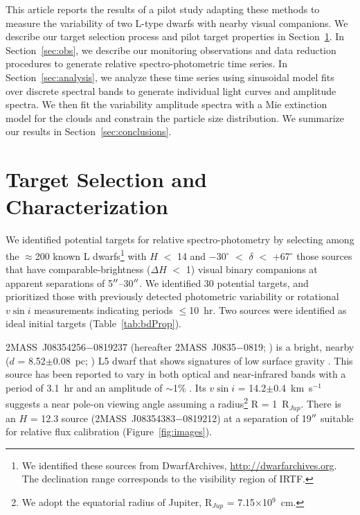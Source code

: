 \documentclass[twocolumn]{aastex6}
\newcommand{\degree}{$^\circ$}
\newcommand{\kms}{km~s$^{-1}$}
\newcommand{\rjup}{R$_{Jup}$}
\newcommand{\sha}{2MASS~J0835$-$0819}
\begin{document}
This article reports the results of a pilot study adapting these methods to measure the variability of two L-type dwarfs with nearby visual companions. We describe our target selection process and pilot target properties in Section~\ref{sec:targets}.
In Section~\ref{sec:obs}, we describe our monitoring observations and data reduction procedures to generate relative spectro-photometric time series.
In Section~\ref{sec:analysis}, we analyze these time series using sinusoidal model fits over discrete spectral bands to generate individual light curves and amplitude spectra.
We then fit the variability amplitude spectra with a Mie extinction model for the clouds and constrain the particle size distribution.
We summarize our results in Section~\ref{sec:conclusions}.

\section{Target Selection and Characterization}\label{sec:targets}

We identified potential targets for relative spectro-photometry by selecting among the $\approx$200 known L dwarfs\footnote{We identified these sources from DwarfArchives,  \url{http://dwarfarchives.org}. The declination range corresponds to the visibility region of IRTF.} with $H$ $<$ 14 and $-$30{\degree}  $<$ $\delta$ $<$ +67{\degree} those sources that have comparable-brightness ($\Delta{H}$ $<$ 1) visual binary companions at apparent separations of 5$\mbox{$^{\prime\prime}$}$--30$\mbox{$^{\prime\prime}$}$. We identified 30 potential targets, and prioritized those with previously detected photometric variability or rotational $v\sin{i}$ measurements indicating periods $\leq$10~hr.  Two sources were identified as ideal initial targets (Table~\ref{tab:bdProp}).

2MASS~J08354256$-$0819237 (hereafter {\sha}; \citealt{2003AJ....126.2421C}) is a bright, nearby ($d$ = 8.52$\pm$0.08~pc; \citealt{2016AJ....152...24W}) L5 dwarf that shows signatures of low surface gravity \citep{2016ApJ...833...96L}. 
This source has been reported to vary in both optical and near-infrared bands with a period of 3.1~hr and an amplitude of $\sim$1\%  \citep{2004MNRAS.354..378K,2014A&A...566A.111W}.
Its $v\sin{i}$ = 14.2$\pm$0.4~{\kms} \citep{2010ApJ...723..684B} suggests a near pole-on viewing angle assuming a radius\footnote{We adopt the equatorial radius of Jupiter, {\rjup} = 7.15$\times$10$^9$~cm.} R = 1~{\rjup}.
There is an $H$ = 12.3 source (2MASS~J08354383$-$0819212) at a separation of 19$\mbox{$^{\prime\prime}$}$ suitable for relative flux calibration (Figure~\ref{fig:images}). 
\end{document}
